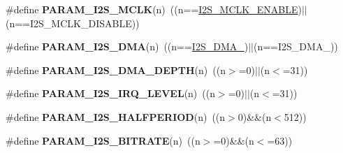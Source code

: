 \begin{DoxyCompactItemize}
\item 
\hypertarget{group___i2_s___private___macros_ga83e4ba3ff0524b11b22d87a628e9170d}{\#define {\bfseries \-P\-A\-R\-A\-M\-\_\-\-I2\-S\-\_\-\-M\-C\-L\-K}(n)~((n==\hyperlink{group___i2_s___public___macros_ga1d6e7b12323fb3c8f341943afe596a43}{\-I2\-S\-\_\-\-M\-C\-L\-K\-\_\-\-E\-N\-A\-B\-L\-E})$|$$|$(n==\-I2\-S\-\_\-\-M\-C\-L\-K\-\_\-\-D\-I\-S\-A\-B\-L\-E))}\label{group___i2_s___private___macros_ga83e4ba3ff0524b11b22d87a628e9170d}

\item 
\hypertarget{group___i2_s___private___macros_ga6dcd868f8a9f0061858ce18d51753bb8}{\#define {\bfseries \-P\-A\-R\-A\-M\-\_\-\-I2\-S\-\_\-\-D\-M\-A}(n)~((n==\hyperlink{group___i2_s___public___macros_ga75aefb3a3233a2f0b37dbeb544d86403}{\-I2\-S\-\_\-\-D\-M\-A\-\_})$|$$|$(n==\-I2\-S\-\_\-\-D\-M\-A\-\_))}\label{group___i2_s___private___macros_ga6dcd868f8a9f0061858ce18d51753bb8}

\item 
\hypertarget{group___i2_s___private___macros_ga896d6deb6a8642351274ec037fa37884}{\#define {\bfseries \-P\-A\-R\-A\-M\-\_\-\-I2\-S\-\_\-\-D\-M\-A\-\_\-\-D\-E\-P\-T\-H}(n)~((n$>$=0)$|$$|$(n$<$=31))}\label{group___i2_s___private___macros_ga896d6deb6a8642351274ec037fa37884}

\item 
\hypertarget{group___i2_s___private___macros_gab1c6a536973382dea6c0ec1fada0a2db}{\#define {\bfseries \-P\-A\-R\-A\-M\-\_\-\-I2\-S\-\_\-\-I\-R\-Q\-\_\-\-L\-E\-V\-E\-L}(n)~((n$>$=0)$|$$|$(n$<$=31))}\label{group___i2_s___private___macros_gab1c6a536973382dea6c0ec1fada0a2db}

\item 
\hypertarget{group___i2_s___private___macros_ga228be505a33001140d74002047342abe}{\#define {\bfseries \-P\-A\-R\-A\-M\-\_\-\-I2\-S\-\_\-\-H\-A\-L\-F\-P\-E\-R\-I\-O\-D}(n)~((n$>$0)\&\&(n$<$512))}\label{group___i2_s___private___macros_ga228be505a33001140d74002047342abe}

\item 
\hypertarget{group___i2_s___private___macros_gab432a03f6b4cfca6fe359e6cca06e017}{\#define {\bfseries \-P\-A\-R\-A\-M\-\_\-\-I2\-S\-\_\-\-B\-I\-T\-R\-A\-T\-E}(n)~((n$>$=0)\&\&(n$<$=63))}\label{group___i2_s___private___macros_gab432a03f6b4cfca6fe359e6cca06e017}

\end{DoxyCompactItemize}


